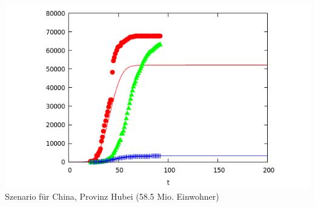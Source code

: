 \documentclass[a4paper,11pt]{article}
\begin{document}
\begin{center}
  \includegraphics[width=.8\textwidth]{Hubei.png}\\[1em]
  {Szenario für China, Provinz Hubei (58.5 Mio. Einwohner)}
\end{center}
\end{document}
